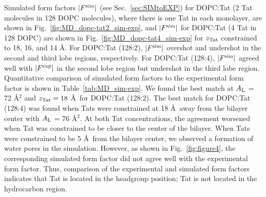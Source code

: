 Simulated form factors $|F^\text{sim}|$ (see Sec.~\ref{sec:SIMtoEXP}) 
for DOPC:Tat (2 Tat molecules in 128 DOPC molecules),
where there is one Tat in each monolayer, are shown in 
Fig.~\ref{fig:MD_dopc-tat2_sim-exp}, and 
$|F^\text{sim}|$ for DOPC:Tat (4 Tat in 128 DOPC) are shown in 
Fig.~\ref{fig:MD_dopc-tat4_sim-exp} 
for $z_\textrm{Tat}$ constrained to 18, 16, and 14 \AA.
For DOPC:Tat (128:2), $|F^\text{sim}|$ overshot and undershot in the second and 
third lobe regions, respectively. 
For DOPC:Tat (128:4), $|F^\text{sim}|$ agreed well with $|F^\text{exp}|$ in the second 
lobe region but undershot in the third lobe region.
Quantitative comparison of simulated form 
factors to the experimental form factor is shown in 
Table~\ref{tab:MD_sim-exp}. We found the best match
at $A_\textrm{L}$ = 72 \AA$^2$ and $z_\textrm{Tat} = 18$ \AA\ for DOPC:Tat (128:2).
The best match for DOPC:Tat (128:4) was found when Tats were 
constrained at 18 \AA\ away from the bilayer center with $A_\textrm{L}$ = 76 \AA$^2$.
At both Tat concentrations, the agreement worsened when Tat was constrained 
to be closer to the center of the bilayer.
When Tats were constrained to be 5 \AA\ from the bilayer center, we
observed a formation of water pores in the simulation. However, 
as shown in Fig.~\ref{fig:figure4}, the corresponding simulated form factor 
did not agree well with the experimental form factor.
Thus, comparison of the experimental and simulated form factors indicates that
Tat is located in the headgroup position; Tat is not located in the hydrocarbon 
region.

